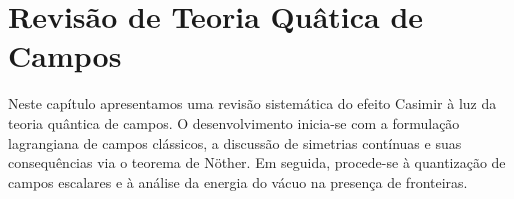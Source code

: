 \chapter{Revisão de Teoria Quâtica de Campos}

Neste capítulo apresentamos uma revisão sistemática do efeito Casimir à luz da teoria quântica de campos. O desenvolvimento inicia-se com a formulação lagrangiana de campos clássicos, a discussão de simetrias contínuas e suas consequências via o teorema de Nöther. Em seguida, procede-se à quantização de campos escalares e à análise da energia do vácuo na presença de fronteiras.


